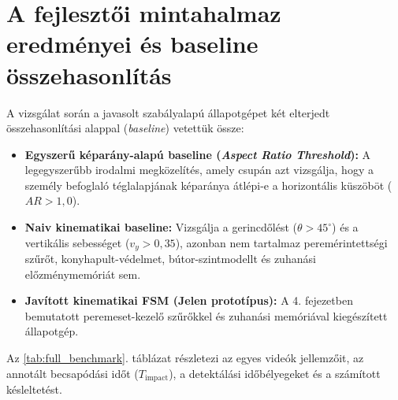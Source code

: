 \documentclass[12pt,a4paper,oneside]{report}
\begin{document}
\section{A fejlesztői mintahalmaz eredményei és baseline összehasonlítás}
A vizsgálat során a javasolt szabályalapú állapotgépet két elterjedt összehasonlítási alappal (\textit{baseline}) vetettük össze:
\begin{itemize}
    \item \textbf{Egyszerű képarány-alapú baseline (\textit{Aspect Ratio Threshold}):} A legegyszerűbb irodalmi megközelítés, amely csupán azt vizsgálja, hogy a személy befoglaló téglalapjának képaránya átlépi-e a horizontális küszöböt ($AR > 1{,}0$).
    \item \textbf{Naiv kinematikai baseline:} Vizsgálja a gerincdőlést ($\theta > 45^\circ$) és a vertikális sebességet ($v_y > 0{,}35$), azonban nem tartalmaz peremérintettségi szűrőt, konyhapult-védelmet, bútor-szintmodellt és zuhanási előzménymemóriát sem.
    \item \textbf{Javított kinematikai FSM (Jelen prototípus):} A 4. fejezetben bemutatott peremeset-kezelő szűrőkkel és zuhanási memóriával kiegészített állapotgép.
\end{itemize}

Az \ref{tab:full_benchmark}. táblázat részletezi az egyes videók jellemzőit, az annotált becsapódási időt ($T_{\text{impact}}$), a detektálási időbélyegeket és a számított késleltetést.
\end{document}
